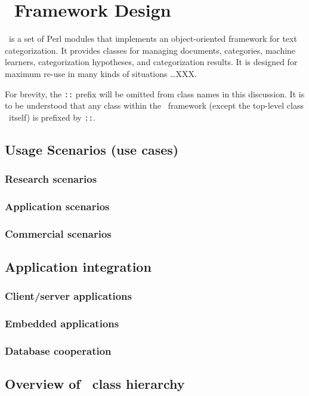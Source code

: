 \chapter{\aicat\ Framework Design}

\aicat\ is a set of Perl modules that implements an
object-oriented framework for text categorization.  It provides
classes for managing documents, categories, machine learners,
categorization hypotheses, and categorization results.
It is designed for maximum re-use in many
kinds of situations \ldots XXX.

For brevity, the \aicat\texttt{::} prefix will be omitted from class
names in this discussion.  It is to be understood that any class
within the \aicat\ framework (except the top-level class
\aicat\ itself) is prefixed by \aicat\texttt{::}.

\section{Usage Scenarios (use cases)}
\subsection{Research scenarios}
\subsection{Application scenarios}
\subsection{Commercial scenarios}

\section{Application integration}
\subsection{Client/server applications}
\subsection{Embedded applications}
\subsection{Database cooperation}

\section{Overview of \aicat\ class hierarchy}
\label{class-overview}

